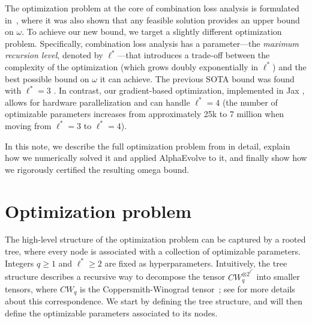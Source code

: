 \documentclass[11pt, a4paper, copyright, gdm]{google}
\newcommand{\method}{{AlphaEvolve}\xspace}
\theoremstyle{definition}
\theoremstyle{remark}
\theoremstyle{plain}
\begin{document}
The optimization problem at the core of combination loss analysis is formulated in~\cite{alman2025more}, where it was also shown that any feasible solution provides an upper bound on $\omega$. To achieve our new bound, we target a slightly different optimization problem. Specifically, combination loss analysis has a parameter---the \emph{maximum recursion level}, denoted by $\ell^*$---that introduces a trade-off between the complexity of the optimization (which grows doubly exponentially in $\ell^*$) and the best possible bound on $\omega$ it can achieve. The previous SOTA bound was found with $\ell^*=3$ \citep{alman2025more}. In contrast, our gradient-based optimization, implemented in Jax \citep{jax2018github}, allows for hardware parallelization and can handle $\ell^*=4$ (the number of optimizable parameters increases from approximately 25k to 7 million when moving from $\ell^* = 3$ to $\ell^* = 4$).

In this note, we describe the full optimization problem from \cite{alman2025more} in detail, explain how we numerically solved it and applied \method to it, and finally show how we rigorously certified the resulting omega bound.

\section{Optimization problem}

The high-level structure of the optimization problem can be captured by a rooted tree, where every node is associated with a collection of optimizable parameters.
Integers $q \ge 1$ and $\ell^* \ge 2$ are fixed as hyperparameters.
Intuitively, the tree structure describes a recursive way to decompose the tensor
$CW_q^{\otimes 2^{\ell^*}}$ into smaller tensors, where $CW_q$ is the Coppersmith-Winograd tensor~\citep{coppersmith1990matrix}; see \cite{alman2025more} for more details about this correspondence. We start by defining the tree structure, and will then define the optimizable parameters associated to its nodes.
\end{document}
